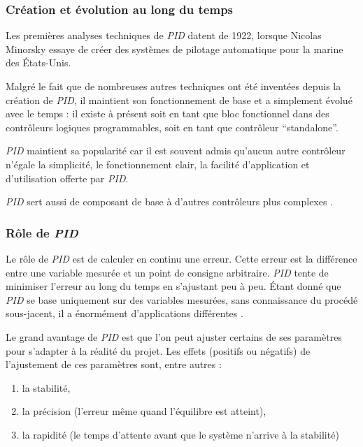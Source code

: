 \documentclass[a4paper,10pt]{report}
\begin{document}
\subsubsection{Création et évolution au long du temps}

Les premières analyses techniques de \emph{PID} datent de 1922, lorsque Nicolas Minorsky essaye de créer des systèmes de pilotage automatique pour la marine des États-Unis. \cite{minorsky1922directional}

Malgré le fait que de nombreuses autres techniques ont été inventées depuis la création de \emph{PID}, il maintient son fonctionnement de base et a simplement évolué avec le temps :
il existe à présent soit en tant que bloc fonctionnel dans des contrôleurs logiques programmables, soit en tant que contrôleur ``standalone''.

\emph{PID} maintient sa popularité car il est souvent admis qu'aucun autre contrôleur n'égale la simplicité, le fonctionnement clair, la facilité d'application et d'utilisation offerte par \emph{PID}.

\emph{PID} sert aussi de composant de base à d'autres contrôleurs plus complexes \cite{ang2005pid} \cite{visioli2006practical}.


\subsubsection{Rôle de \emph{PID}}
Le rôle de \emph{PID} est de calculer en continu une erreur.
Cette erreur est la différence entre une variable mesurée et un point de consigne arbitraire.
\emph{PID} tente de minimiser l'erreur au long du temps en s'ajustant peu à peu.
Étant donné que \emph{PID} se base uniquement sur des variables mesurées, sans connaissance du procédé sous-jacent, il a énormément d'applications différentes \cite{bennett1993history}.

Le grand avantage de \emph{PID} est que l'on peut ajuster certains de ses paramètres pour s'adapter à la réalité du projet.
Les effets (positifs ou négatifs) de l'ajustement de ces paramètres sont, entre autres \cite{zhong2006pid} :
\begin{enumerate}
\item la stabilité,
\item la précision (l'erreur même quand l'équilibre est atteint),
\item la rapidité (le temps d'attente avant que le système n'arrive à la stabilité)
\end{enumerate}
\end{document}
